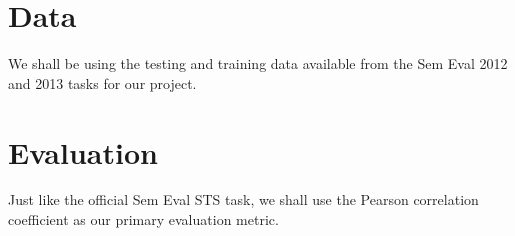 \documentclass[11pt]{article}
\begin{document}
\section{Data}
We shall be using the testing and training data available from the Sem Eval 2012 and 2013 tasks for our project.
\section{Evaluation}
Just like the official Sem Eval STS task, we shall use the Pearson correlation coefficient as our primary evaluation metric.



\nocite{*}

\end{document}
